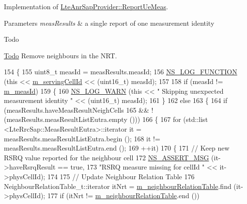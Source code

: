 Implementation of \hyperlink{classns3_1_1LteAnrSapProvider_ac4f1114bd33d0c189e2ce2624089e587}{Lte\+Anr\+Sap\+Provider\+::\+Report\+Ue\+Meas}. 


\begin{DoxyParams}{Parameters}
{\em meas\+Results} & a single report of one measurement identity \\
\hline
\end{DoxyParams}
\begin{DoxyRefDesc}{Todo}
\item[\hyperlink{todo__todo000081}{Todo}]Remove neighbours in the N\+RT. \end{DoxyRefDesc}

\begin{DoxyCode}
154 \{
155   uint8\_t measId = measResults.measId;
156   \hyperlink{log-macros-disabled_8h_a90b90d5bad1f39cb1b64923ea94c0761}{NS\_LOG\_FUNCTION} (\textcolor{keyword}{this} << \hyperlink{classns3_1_1LteAnr_a9a2e5aef479439b1f909f46f260f7092}{m\_servingCellId} << (uint16\_t) measId);
157 
158   \textcolor{keywordflow}{if} (measId != \hyperlink{classns3_1_1LteAnr_a59e92d899d5e105c0dad69d79310a844}{m\_measId})
159     \{
160       \hyperlink{group__logging_gade7208b4009cdf0e25783cd26766f559}{NS\_LOG\_WARN} (\textcolor{keyword}{this} << \textcolor{stringliteral}{" Skipping unexpected measurement identity "} << (uint16\_t) measId);
161     \}
162   \textcolor{keywordflow}{else}
163     \{
164       \textcolor{keywordflow}{if} (measResults.haveMeasResultNeighCells
165           && !(measResults.measResultListEutra.empty ()))
166         \{
167           \textcolor{keywordflow}{for} (std::list <LteRrcSap::MeasResultEutra>::iterator it = measResults.measResultListEutra.begin 
      ();
168                it != measResults.measResultListEutra.end ();
169                ++it)
170             \{
171               \textcolor{comment}{// Keep new RSRQ value reported for the neighbour cell}
172               \hyperlink{assert_8h_aff5ece9066c74e681e74999856f08539}{NS\_ASSERT\_MSG} (it->haveRsrqResult == \textcolor{keyword}{true},
173                              \textcolor{stringliteral}{"RSRQ measure missing for cellId "} << it->physCellId);
174 
175               \textcolor{comment}{// Update Neighbour Relation Table}
176               NeighbourRelationTable\_t::iterator itNrt = 
      \hyperlink{classns3_1_1LteAnr_a90fc8417020463e795dc960f2f53bc24}{m\_neighbourRelationTable}.find (it->physCellId);
177               \textcolor{keywordflow}{if} (itNrt != \hyperlink{classns3_1_1LteAnr_a90fc8417020463e795dc960f2f53bc24}{m\_neighbourRelationTable}.end ())

\end{DoxyCode}
